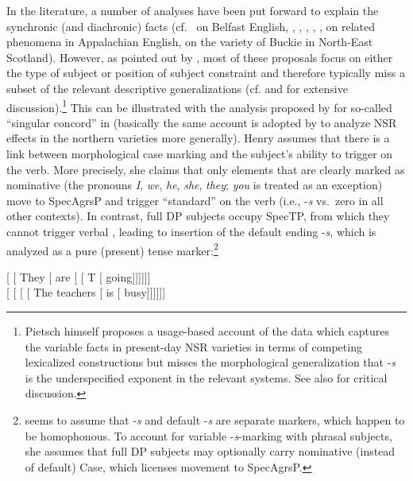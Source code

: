 \documentclass[output=paper]{langsci/langscibook}
\begin{document}
In the literature, a number of analyses have been put forward to explain the
synchronic (and diachronic) facts (cf.\ \citealt{Henry:1995} on Belfast
English, \citealt{Boerjarschapman:1998}, \citealt{Hudson:1999},
\citealt{Pietsch:2005a}, \citealt{deHaas2008,deHaas:2011},
\citealt{deHaasandvanKemenade:2015}, \citealt{TortoraDenDikken:2010} on related
phenomena in Appalachian English, \citealt{AdgerSmith2010} on the variety of
Buckie in North-East Scotland).  However, as pointed out by
\textcite[180]{Pietsch:2005a}, most of these proposals focus on either the type
of subject or position of subject constraint and therefore typically miss a
subset of the relevant descriptive generalizations (cf.
\citealt{Pietsch:2005a} and \citealt{deHaas:2011} for extensive
discussion).\footnote{Pietsch himself proposes a usage-based account of the
    data which captures the variable  facts in present-day \gls{NSR}
    varieties in terms of competing lexicalized constructions but misses the
morphological generalization that -\emph{s} is the underspecified exponent in
the relevant systems. See also \textcite[1122f.]{AdgerSmith2010} for critical
discussion.} This can be illustrated with the analysis proposed by
\textcite{Henry:1995} for so-called ``singular concord'' in 
(basically the same account is adopted by \citealt{deHaas2008} to analyze
\gls{NSR} effects in the northern varieties more generally). Henry assumes that
there is a link between morphological case marking and the subject's ability to
trigger  on the verb. More precisely, she claims that only elements
that are clearly marked as nominative (the pronouns \emph{I}, \emph{we},
\emph{he}, \emph{she}, \emph{they}; \emph{you} is treated as an exception) move
to SpecAgrsP and trigger ``standard''  on the verb (i.e., \Tsg{}
-\emph{s} vs.\ zero in all other contexts). In contrast, full DP subjects
occupy SpecTP, from which they cannot trigger verbal , leading to
insertion of the default ending -\emph{s}, which is analyzed as a pure
(present) tense marker:\footnote{\citeauthor{Henry:1995} seems to assume that
    \Tsg{} -\emph{s} and default -\emph{s} are separate markers, which happen
    to be homophonous.  To account for variable -\emph{s}-marking with phrasal
    subjects, she assumes that full DP subjects may optionally carry nominative
    (instead of default) Case, which licenses movement to SpecAgrsP.}

\ea
	\ea \mbox [ [ They [ are [ [ T [ going]]]]]]\\
	\ex \mbox [ [ [ [ The teachers [ is [ busy]]]]]]\\
    \z
\z
\end{document}
